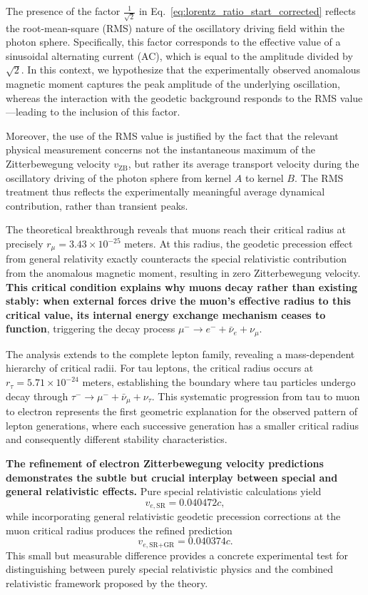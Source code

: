 \documentclass[%
 reprint,
 amsmath,amssymb,
 aps,
]{revtex4-1}
\numberwithin{equation}{section}%
\begin{document}
The presence of the factor \( \frac{1}{\sqrt{2}} \) in Eq.~\eqref{eq:lorentz_ratio_start_corrected} reflects the root-mean-square (RMS) nature of the oscillatory driving field within the photon sphere. Specifically, this factor corresponds to the effective value of a sinusoidal alternating current (AC), which is equal to the amplitude divided by \( \sqrt{2} \). In this context, we hypothesize that the experimentally observed anomalous magnetic moment captures the peak amplitude of the underlying oscillation, whereas the interaction with the geodetic background responds to the RMS value—leading to the inclusion of this factor. 

Moreover, the use of the RMS value is justified by the fact that the relevant physical measurement concerns not the instantaneous maximum of the Zitterbewegung velocity \( v_{\mathrm{ZB}} \), but rather its average transport velocity during the oscillatory driving of the photon sphere from kernel $A$ to kernel $B$. The RMS treatment thus reflects the experimentally meaningful average dynamical contribution, rather than transient peaks.

The theoretical breakthrough reveals that muons reach their critical radius at precisely $r_{\mu} = 3.43 \times 10^{-25}$ meters. At this radius, the geodetic precession effect from general relativity exactly counteracts the special relativistic contribution from the anomalous magnetic moment, resulting in zero Zitterbewegung velocity. \textbf{This critical condition explains why muons decay rather than existing stably: when external forces drive the muon's effective radius to this critical value, its internal energy exchange mechanism ceases to function}, triggering the decay process $\mu^- \rightarrow e^- + \bar{\nu}_e + \nu_{\mu}$.

The analysis extends to the complete lepton family, revealing a mass-dependent hierarchy of critical radii. For tau leptons, the critical radius occurs at $r_{\tau} = 5.71 \times 10^{-24}$ meters, establishing the boundary where tau particles undergo decay through $\tau^- \rightarrow \mu^- + \bar{\nu}_{\mu} + \nu_{\tau}$. This systematic progression from tau to muon to electron represents the first geometric explanation for the observed pattern of lepton generations, where each successive generation has a smaller critical radius and consequently different stability characteristics.

\textbf{The refinement of electron Zitterbewegung velocity predictions demonstrates the subtle but crucial interplay between special and general relativistic effects.} Pure special relativistic calculations yield
\begin{equation}
v_{e,\text{SR}} = 0.040472c,
\label{eq:v_e_SR}
\end{equation}
while incorporating general relativistic geodetic precession corrections at the muon critical radius produces the refined prediction
\begin{equation}
v_{e,\text{SR+GR}} = 0.040374c.
\label{eq:v_e_SR_GR}
\end{equation}
This small but measurable difference provides a concrete experimental test for distinguishing between purely special relativistic physics and the combined relativistic framework proposed by the theory.
\end{document}
